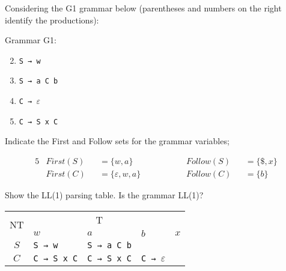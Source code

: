 \documentclass[docid=2019]{comp_exam_round2}
\begin{document}
\setcounter{chapter}{2018}

\examgroup{}

Considering the G1 grammar below (parentheses and numbers on the right identify the productions):

\begin{center}
    \begin{minipage}{0.15\textwidth}
        Grammar G1:

        \begin{enumerate}
            \setcounter{enumi}{1}
            \item \texttt{S → w}
            \item \texttt{S → a C b}
            \item \texttt{C → $\varepsilon$}
            \item \texttt{C → S x C}
        \end{enumerate}
    \end{minipage}
\end{center}

\question
Indicate the First and Follow sets for the grammar variables;

\ansseparator

\vspace{-2.0em}
\begin{alignat*}{5}
    & First(S) &&= \{ w, a              \} && ~~~~~~~~~~ && Follow(S) &&= \{ \$, x \} \\
    & First(C) &&= \{ \varepsilon, w, a \} && ~~~~~~~~~~ && Follow(C) &&= \{ b     \}
\end{alignat*}
\vspace{-3.0em}

\question
Show the LL(1) parsing table. Is the grammar LL(1)?

\ansseparator

\begin{center}
    \small
    \begin{tabular}{@{} c | p{30mm} | p{30mm} | p{30mm} | p{30mm} @{}}
        \multirow{2}{*}{NT} & \multicolumn{3}{c}{T} \\ \cline{2-5}
            & $w$ & $a$ & $b$ & $x$ \\ \hline
        $S$ & \texttt{S → w}     & \texttt{S → a C b} & \\ \hline
        $C$ & \texttt{C → S x C} & \texttt{C → S x C} & \texttt{C → $\varepsilon$}
    \end{tabular}
\end{center}
\end{document}

